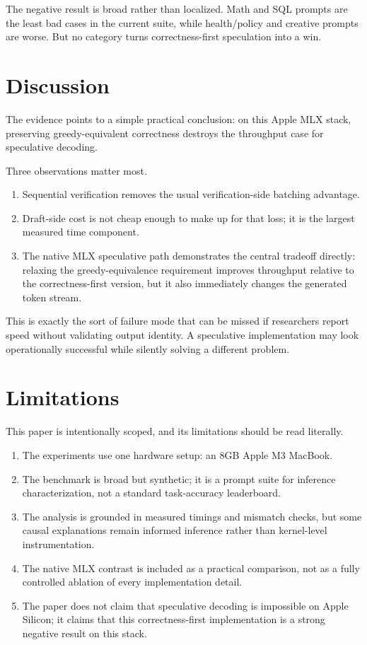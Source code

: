 \documentclass[11pt]{article}
\begin{document}
The negative result is broad rather than localized. Math and SQL prompts are the least bad cases in the current suite, while health/policy and creative prompts are worse. But no category turns correctness-first speculation into a win.

\section{Discussion}

The evidence points to a simple practical conclusion: on this Apple MLX stack, preserving greedy-equivalent correctness destroys the throughput case for speculative decoding.

Three observations matter most.
\begin{enumerate}
    \item Sequential verification removes the usual verification-side batching advantage.
    \item Draft-side cost is not cheap enough to make up for that loss; it is the largest measured time component.
    \item The native MLX speculative path demonstrates the central tradeoff directly: relaxing the greedy-equivalence requirement improves throughput relative to the correctness-first version, but it also immediately changes the generated token stream.
\end{enumerate}

This is exactly the sort of failure mode that can be missed if researchers report speed without validating output identity. A speculative implementation may look operationally successful while silently solving a different problem.

\section{Limitations}

This paper is intentionally scoped, and its limitations should be read literally.
\begin{enumerate}
    \item The experiments use one hardware setup: an 8GB Apple M3 MacBook.
    \item The benchmark is broad but synthetic; it is a prompt suite for inference characterization, not a standard task-accuracy leaderboard.
    \item The analysis is grounded in measured timings and mismatch checks, but some causal explanations remain informed inference rather than kernel-level instrumentation.
    \item The native MLX contrast is included as a practical comparison, not as a fully controlled ablation of every implementation detail.
    \item The paper does not claim that speculative decoding is impossible on Apple Silicon; it claims that this correctness-first implementation is a strong negative result on this stack.
\end{enumerate}
\end{document}
